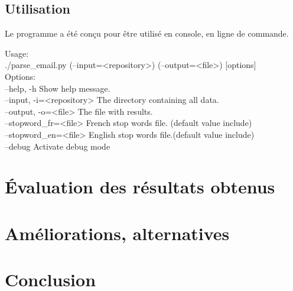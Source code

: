 \documentclass[11pt,a4paper]{article}
\begin{document}
\subsection*{Utilisation}
Le programme a été conçu pour être utilisé en console, en ligne de commande.

Usage:\\
    ./parse\_email.py (--input=<repository>) (--output=<file>) [options]\\

Options:\\
    --help, -h                  Show help message.\\
    --input, -i=<repository>    The directory containing all data.\\
    --output, -o=<file>         The file with results.\\
    --stopword\_fr=<file>       French stop words file. (default value include)\\
    --stopword\_en=<file>       English stop words file.(default value include)\\
    --debug                     Activate debug mode\\


\section*{Évaluation des résultats obtenus}

\section*{Améliorations, alternatives}

\section*{Conclusion}
\end{document}
